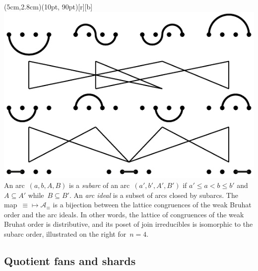 \documentclass{amsart}
\theoremstyle{definition}
\renewcommand{\c}[1]{\mathcal{#1}} %
\newcommand{\darkblue}{\color{darkblue}} %
\newcommand{\defn}[1]{\textsl{\darkblue #1}} %
\begin{document}
\vspace{-.1cm}
\parpic(5cm,2.8cm)(10pt, 90pt)[r][b]{\includegraphics[scale=.5]{subarcOrder}}{
An arc~$(a, b, A, B)$ is a \defn{subarc} of an arc~$(a', b', A', B')$ if \linebreak $a' \le a < b \le b'$ and~$A \subseteq A'$ while~$B \subseteq B'$.
An \defn{arc ideal} is a subset of arcs closed by subarcs.
The map~${\equiv} \mapsto \c{A}_\equiv$ is a bijection between the lattice congruences of the weak Bruhat order and the arc ideals.
In other words, the lattice of congruences of the weak Bruhat order is distributive, and its poset of join irreducibles is isomorphic to the subarc order, illustrated on the right for~$n = 4$.
}


\subsection{Quotient fans and shards}
\label{subsec:quotientFans}
\end{document}
